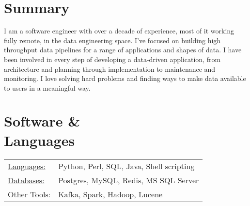 \documentclass[margin]{res}
\begin{document}

\address{Baltimore, MD --- (917) 678 3636 \\
\href{mailto:mark.tozzi@gmail.com}{mark.tozzi@gmail.com}
$\bullet$ \href{https://github.com/not-napoleon}{github: not-napoleon}
$\bullet$ \href{https://twitter.com/not_napoleon}{twitter: not\_napoleon} }


\begin{resume}

\section{Summary}
I am a software engineer with over a decade of experience, most of it working
fully remote, in the data engineering space.  I've focused on building high
throughput data pipelines for a range of applications and shapes of data.
I have been involved in every step of developing a data-driven application,
from architecture and planning through implementation to maintenance and
monitoring.  I love solving hard problems and finding ways to make data
available to users in a meaningful way.

\section{Software \& \\ Languages}
   \begin{tabular}{l p{3in}}
     \underline{Languages:} & Python, Perl, SQL, Java, Shell scripting\\
     \underline{Databases:} & Postgres, MySQL, Redis, MS SQL Server \\
     \underline{Other Tools:} & Kafka, Spark, Hadoop, Lucene
   \end{tabular}

\raggedright{}

\end{resume}
\end{document}
